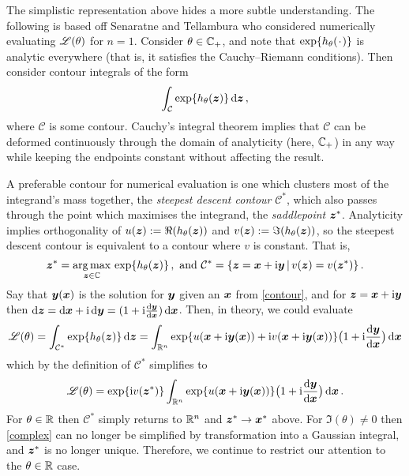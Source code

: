 \begin{remark}

The simplistic representation above hides a more subtle understanding. The following is based off Senaratne and Tellambura \cite{senaratne2009numerical} who considered numerically evaluating $\mathscr{L}(\theta)$ for $n=1$. Consider $\theta \in \mathbb{C}_+$, and note that $\exp\{ h_\theta(\argdot) \}$ is analytic everywhere (that is, it satisfies the Cauchy--Riemann conditions). Then consider contour integrals of the form
\[ \int_{\mathcal{C}} \exp\{ h_\theta(\bm{z}) \} \mathop{}\!\mathrm{d} \bm{z} \,, \]
where $\mathcal{C}$ is some contour. Cauchy's integral theorem implies that $\mathcal{C}$ can be deformed continuously through the domain of analyticity (here, $\mathbb{C}_+$) in any way while keeping the endpoints constant without affecting the result.

A preferable contour for numerical evaluation is one which clusters most of the integrand's mass together, the \emph{steepest descent contour} $\mathcal{C}^*$, which also passes through the point which maximises the integrand, the \emph{saddlepoint} $\bm{z}^*$. Analyticity implies orthogonality of $u(\bm{z}) := \Re(h_\theta(\bm{z}))$ and $v(\bm{z}) := \Im(h_\theta(\bm{z}))$,
so the steepest descent contour is equivalent to a contour where $v$ is constant. That is,
\begin{equation} \label{contour}
	\bm{z}^* = \operatorname*{arg\,max}_{\bm{z} \in \mathbb{C}} \, \exp\{ h_\theta(\bm{z}) \} \,, \text{ and } \mathcal{C}^* = \{ \bm{z} = \bm{x}+\mathrm{i} \bm{y} \,|\, v(\bm{z}) = v(\bm{z}^*) \} \,.
\end{equation}
Say that $\bm{y}(\bm{x})$ is the solution for $\bm{y}$ given an $\bm{x}$ from \eqref{contour}, and for $\bm{z} = \bm{x} + \mathrm{i} \bm{y}$ then $\mathop{}\!\mathrm{d} \bm{z} = \mathop{}\!\mathrm{d} \bm{x} + \mathrm{i} \mathop{}\!\mathrm{d} \bm{y} = (1 + \mathrm{i} \frac{\mathop{}\!\mathrm{d} \bm{y}}{\mathop{}\!\mathrm{d} \bm{x}}) \mathop{}\!\mathrm{d} \bm{x}$. Then, in theory, we could evaluate
\[ \mathscr{L}(\theta) = \int_{\mathcal{C}^*} \exp\{ h_\theta(\bm{z}) \} \mathop{}\!\mathrm{d} \bm{z} = \int_{\mathbb{R}^n} \exp\{ u(\bm{x} + \mathrm{i} \bm{y}(\bm{x})) + \mathrm{i} v(\bm{x} + \mathrm{i} \bm{y}(\bm{x})) \} \bigl(1 + \mathrm{i} \frac{\mathop{}\!\mathrm{d} \bm{y}}{\mathop{}\!\mathrm{d} \bm{x}} \bigr) \mathop{}\!\mathrm{d} \bm{x} \]
which by the definition of $\mathcal{C}^*$ simplifies to
\begin{equation} \label{complex}
	\mathscr{L}(\theta) = \exp\{\mathrm{i} v(\bm{z}^*)\} \int_{\mathbb{R}^n} \exp\{u(\bm{x} + \mathrm{i} \bm{y}(\bm{x}))\} \bigl(1 + \mathrm{i} \frac{\mathop{}\!\mathrm{d} \bm{y}}{\mathop{}\!\mathrm{d} \bm{x}} \bigr) \mathop{}\!\mathrm{d} \bm{x} \,.
\end{equation}
For $\theta \in \mathbb{R}$ then $\mathcal{C}^*$ simply returns to $\mathbb{R}^n$ and $\bm{z}^* \to \bm{x}^*$ above.
For $\Im(\theta) \not= 0$ then \eqref{complex} can no longer be simplified by transformation into a Gaussian integral, and $\bm{z}^*$ is no longer unique. Therefore, we continue to restrict our attention to the $\theta \in \mathbb{R}$ case. \remQED
\end{remark}

